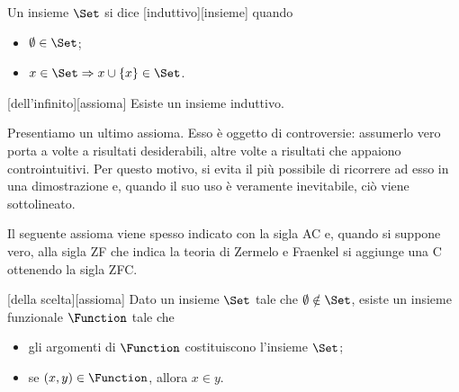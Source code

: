 \begin{Definition}
	Un insieme $\Set$ si dice [induttivo][insieme] quando
	\begin{itemize}
		\item $\emptyset \in \Set$;
		\item $x \in \Set \Rightarrow x \cup \lbrace x \rbrace \in \Set$.
	\end{itemize}
\end{Definition}
\begin{Axiom}
	[dell'infinito][assioma] Esiste un insieme induttivo.
\end{Axiom}
\par Presentiamo un ultimo assioma. Esso \`e oggetto di controversie: assumerlo vero porta a volte a risultati desiderabili, altre volte a risultati che appaiono controintuitivi. Per questo motivo, si evita il pi\`u possibile di ricorrere ad esso in una dimostrazione e, quando il suo uso \`e veramente inevitabile, ci\`o viene sottolineato.
\par Il seguente assioma viene spesso indicato con la sigla AC e, quando si suppone vero, alla sigla ZF che indica la teoria di Zermelo e Fraenkel si aggiunge una C ottenendo la sigla ZFC.
\begin{Axiom}
	[della scelta][assioma] Dato un insieme $\Set$ tale che $\emptyset \notin \Set$, esiste un insieme funzionale $\Function$ tale che
	\begin{itemize}
		\item gli argomenti di $\Function$ costituiscono l'insieme $\Set$;
		\item se $(x,y) \in \Function$, allora $x \in y$.
	\end{itemize}
\end{Axiom}
